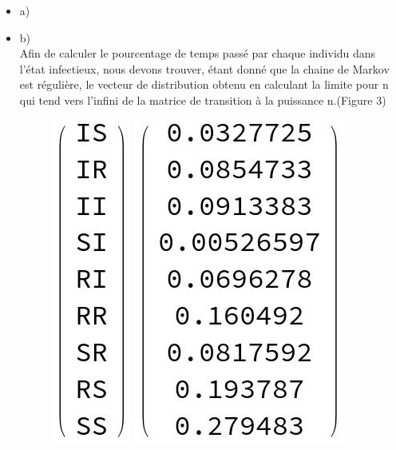 \documentclass[a4paper, 11pt, oneside]{article}
\begin{document}
\begin{itemize}
    \item a)
    \\
    \item b)
    \\Afin de calculer le pourcentage de temps passé par chaque individu 
    dans l'état infectieux, nous devons trouver, étant donné que la chaine de Markov 
    est régulière, le vecteur de distribution obtenu en calculant la limite pour n qui 
    tend vers l'infini de la matrice de transition à la puissance n.(Figure 3)
    \begin{figure}[h]
        \centering
        \includegraphics[scale=0.55]{ordre_matrice_transitionQ4.jpg}
        \includegraphics[scale=0.55]{vecteur_Q5.jpg}

\end{figure}
\end{itemize}
\end{document}
